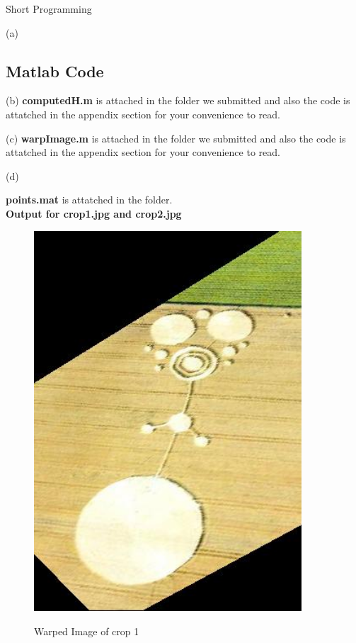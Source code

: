 \documentclass[a4paper,12pt]{article}
\begin{document}
\begin{section}{Short Programming}
\begin{subsection}{(a)}

\section*{Matlab Code}




\end{subsection}

\begin{subsection}{(b)}
\textbf{computedH.m} is attached in the folder we submitted and also the code is attatched in the appendix section for your convenience to read.  


\end{subsection}

\begin{subsection}{(c)}
\textbf{warpImage.m} is attached in the folder we submitted and also the code is attatched in the appendix section for your convenience to read.  


\end{subsection}

\clearpage
\begin{subsection}{(d)}

\textbf{points.mat} is attatched in the folder.
\\
\textbf{Output for crop1.jpg and crop2.jpg}\\

 \begin{figure}[!htb]
       \center
       {\includegraphics[width=10cm]
       {crop_warp.png}}
        \caption{Warped Image of crop 1}
      \end{figure}




\end{subsection}
\end{section}
\end{document}
